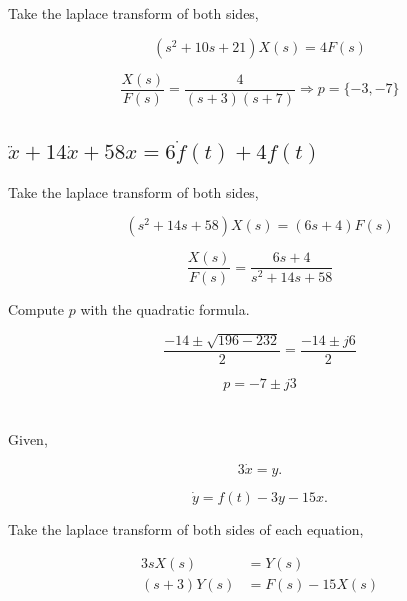 \documentclass[12pt]{article}
\numberwithin{equation}{section}
\begin{document}
  Take the laplace transform of both sides,

  \begin{equation}
    (s ^2 + 10s + 21) X(s) = 4F(s)
  \end{equation}

  \begin{equation}
    \frac{X(s)}{F(s)} = \frac{4}{(s+3)(s+7)} \Rightarrow p = \{-3, -7\}
  \end{equation}

  \subsection{$ \ddot x + 14\dot x + 58x = 6\dot f(t) + 4f(t)$}

  Take the laplace transform of both sides,

  \begin{equation}
    (s ^2 + 14s + 58)X(s) = (6s + 4)F(s)
  \end{equation}

  \begin{equation}
    \frac{X(s)}{F(s)} = \frac{6s + 4}{s ^2 + 14s + 58}
  \end{equation}

  Compute $ p $ with the quadratic formula.

  \begin{equation}
    \frac{-14 \pm \sqrt{196 - 232}}{2} = \frac{-14 \pm j6}{2}
  \end{equation}

  \begin{equation}
    p = -7 \pm j3
  \end{equation}





  \newpage
  \section{}

  Given,

  \[
      3\dot x = y
    .\]

  \[
      \dot y = f(t) - 3y - 15x
    .\]

  Take the laplace transform of both sides of each equation,

  \begin{equation}
    \begin{aligned}
      3sX(s) &= Y(s) \\
      (s + 3)Y(s) &= F(s) - 15X(s)
    \end{aligned}
  \end{equation}
\end{document}
